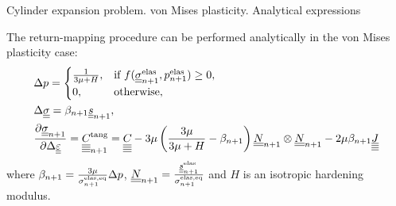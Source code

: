 \documentclass[9pt]{beamer}
\begin{document}
\begin{frame}{Cylinder expansion problem. von Mises plasticity. Analytical expressions}

  The return-mapping procedure can be performed analytically in the von Mises plasticity case:
  \begin{align}
    & \Delta p = 
    \begin{cases}
        \frac{1}{3\mu + H}, & \text{if } f(\underline{\underline{\sigma}}^\text{elas}_{n+1}, p^\text{elas}_{n+1}) \geq 0,\\
        0, & \text{otherwise},
    \end{cases} \label{eqn:dp_von_mises}\\
    & \Delta\underline{\underline{\sigma}} = \beta_{n+1}\underline{\underline{s}}_{n+1}, \label{eqn:dsigma_von_mises} \\
    & \dfrac{\partial\underline{\underline{\sigma}}_{n+1}}{\partial\Delta\underline{\underline{\varepsilon}}} = \underline{\underline{\underline{\underline{C_{}}}}}_{n+1}^{\text{tang}} = \underline{\underline{\underline{\underline{C_{}}}}} - 3\mu \left( \frac{3\mu}{3\mu + H} -\beta_{n+1} \right) \underline{\underline{N}}_{n+1} \otimes \underline{\underline{N}}_{n+1} - 2\mu\beta_{n+1}\underline{\underline{\underline{\underline{J}}}} \label{eqn:C_tang_von_mises}
  \end{align}
  where $\beta_{n+1} = \frac{3\mu}{\sigma_{n+1}^\text{elas,eq}}\Delta p$, \quad $\underline{\underline{N}}_{n+1} = \frac{\underline{\underline{s}}^\text{elas}_{n+1}}{\sigma_{n+1}^\text{elas,eq}}$ and $H$ is an isotropic hardening modulus.


\end{frame}
\end{document}
